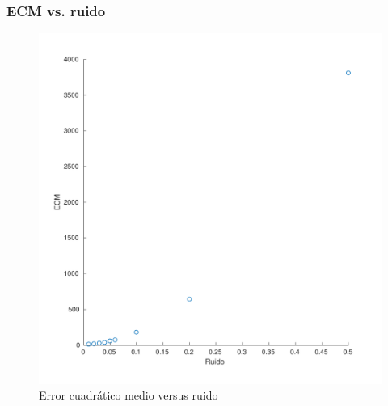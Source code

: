 \documentclass[11pt]{beamer}
\begin{document}
\begin{frame}
\frametitle{ECM vs. ruido}
\begin{figure}
\centering
        \includegraphics[scale=0.4]{img/ruido_ecm-eps-converted-to.pdf}
        \caption{Error cuadrático medio versus ruido}
        \label{fig:ECM vs ruido}
\end{figure}
\end{frame}
\end{document}
